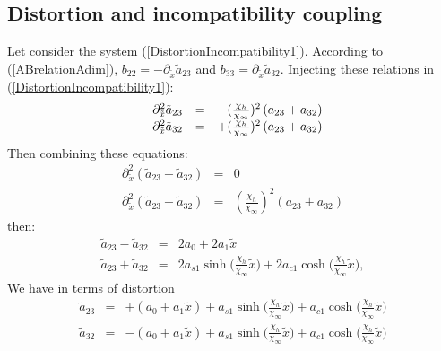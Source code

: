 \documentclass[
10pt, %
a4paper, %
oneside, %
headinclude,footinclude, %
table
]{scrartcl}
\begin{document}
\subsection{Distortion and incompatibility coupling}
Let consider the system (\ref{DistortionIncompatibility1}). According to (\ref{ABrelationAdim}), $b_{22}=-\partial_{\tilde{x}}\tilde{a}_{23}$ and $b_{33}=\partial_{\tilde{x}}\tilde{a}_{32}$. Injecting these relations in (\ref{DistortionIncompatibility1}):
\begin{equation}\label{DistortionIncompatibility2}
\begin{array}{rcl}
-\partial_{\tilde{x}}^2\tilde{a}_{23}&=&-(\frac{\chi_{h}}{\chi_{\infty}})^2\left(a_{23}+a_{32}\right)\\
\partial_{\tilde{x}}^2\tilde{a}_{32}&=&+(\frac{\chi_{h}}{\chi_{\infty}})^2\left(a_{23}+a_{32}\right)
\end{array}
\end{equation}
Then combining these equations:
\begin{equation}
\begin{array}{rcl}
\partial_{\tilde{x}}^2(\tilde{a}_{23}-\tilde{a}_{32})&=&0\\
\partial_{\tilde{x}}^2(\tilde{a}_{23}+\tilde{a}_{32})&=&(\frac{\chi_{h}}{\chi_{\infty}})^2\left(a_{23}+a_{32}\right)
\end{array}
\end{equation}
then: 
\begin{equation}
\begin{array}{rcl}
\tilde{a}_{23}-\tilde{a}_{32}&=&2a_{0}+2a_{1}\tilde{x}
\\
\tilde{a}_{23}+\tilde{a}_{32}&=&2a_{s1}\sinh{(\frac{\chi_{h}}{\chi_{\infty}}\tilde{x}})+2a_{c1}\cosh{(\frac{\chi_{h}}{\chi_{\infty}}\tilde{x}}),
\end{array}
\end{equation}
We have in terms of distortion
\begin{equation}
\begin{array}{rcl}
\tilde{a}_{23}&=&+(a_{0}+a_{1}\tilde{x})+a_{s1}\sinh{(\frac{\chi_{h}}{\chi_{\infty}}\tilde{x}})+a_{c1}\cosh{(\frac{\chi_{h}}{\chi_{\infty}}\tilde{x}})
\\
\tilde{a}_{32}&=&-(a_{0}+a_{1}\tilde{x})+a_{s1}\sinh{(\frac{\chi_{h}}{\chi_{\infty}}\tilde{x}})+a_{c1}\cosh{(\frac{\chi_{h}}{\chi_{\infty}}\tilde{x}})
\end{array}
\end{equation}
\end{document}
